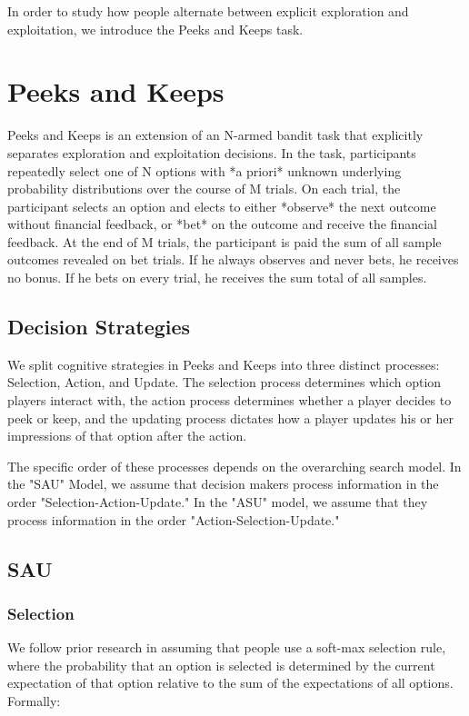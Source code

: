 \documentclass[a4paper,doc,natbib,floatsintext]{apa6}\usepackage[]{graphicx}\usepackage[]{color}
\begin{document}
In order to study how people alternate between explicit exploration and exploitation, we introduce the Peeks and Keeps task.


\section{Peeks and Keeps}

Peeks and Keeps is an extension of an N-armed bandit task that explicitly separates exploration and exploitation decisions. In the task, participants repeatedly select one of N options with *a priori* unknown underlying probability distributions over the course of M trials. On each trial, the participant selects an option and elects to either *observe* the next outcome without financial feedback, or *bet* on the outcome and receive the financial feedback. At the end of M trials, the participant is paid the sum of all sample outcomes revealed on bet trials. If he always observes and never bets, he receives no bonus. If he bets on every trial, he receives the sum total of all samples.

\subsection{Decision Strategies}

We split cognitive strategies in Peeks and Keeps into three distinct processes: Selection, Action, and Update. The selection process determines which option players interact with, the action process determines whether a player decides to peek or keep, and the updating process dictates how a player updates his or her impressions of that option after the action.

The specific order of these processes depends on the overarching search model. In the "SAU" Model, we assume that decision makers process information in the order "Selection-Action-Update." In the "ASU" model, we assume that they process information in the order "Action-Selection-Update."

\subsection{SAU}

\subsubsection{Selection}

We follow prior research in assuming that people use a soft-max selection rule, where the probability that an option is selected is determined by the current expectation of that option relative to the sum of the expectations of all options. Formally:
\end{document}
